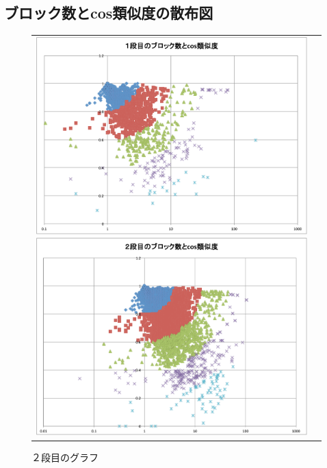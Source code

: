 \documentclass[twocolumn,9pt,a4paper]{jsarticle}
\begin{document}
\subsection{ブロック数とcos類似度の散布図}
\begin{figure}[h]
 \begin{tabular}{cc}
 	\begin{minipage}[t]{0.45\hsize}
	 \centering
	 \includegraphics[keepaspectratio, scale = 0.15]{graph_1_block.pdf}
	 \caption{１段目のグラフ}
	 \label{first_block}
	\end{minipage}
        \begin{minipage}[t]{0.45\hsize}
	 \centering
	 \includegraphics[keepaspectratio, scale = 0.15]{graph_2_block.pdf}
	 \caption{２段目のグラフ}
	 \label{second_block}

\end{minipage}
\end{tabular}
\end{figure}
\end{document}
